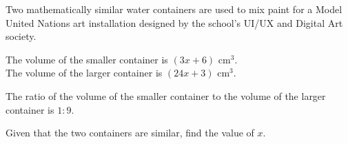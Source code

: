 \begin{question}
\noindent Two mathematically similar water containers are used to mix paint for a Model United Nations art installation designed by the school's UI/UX and Digital Art society.

\noindent The volume of the smaller container is $(3x + 6)$ cm$^3$.\\
The volume of the larger container is $(24x + 3)$ cm$^3$.

\noindent The ratio of the volume of the smaller container to the volume of the larger container is $1 : 9$.

\noindent Given that the two containers are similar, find the value of $x$.

\vspace{5cm}

\begin{flushright}
\end{flushright}
\end{question}
